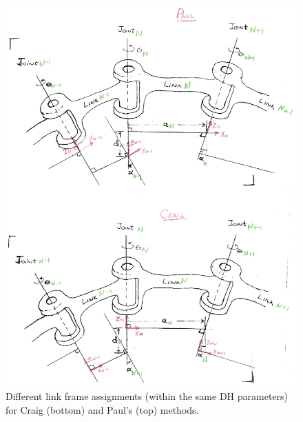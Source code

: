 \begin{figure}
\includegraphics[width=150mm]{figs03/00714.eps}
\caption{Different link frame assignments (within the same DH parameters) for Craig (bottom) and Paul's (top)  methods.}\label{CraigPaulLinkFrames}
\end{figure}



%
%
% 
